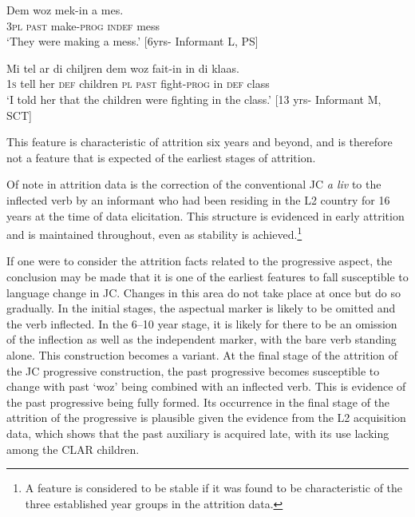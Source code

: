 \documentclass[output=paper,colorlinks,citecolor=brown]{langscibook}
\begin{document}
\ea \label{bkm:messamK:34}
\gll  Dem woz   mek-in       a        mes.\\
3\textsc{pl}    \textsc{past} make-\textsc{prog} \textsc{indef} mess\\
\glt `They were making a mess.’              [6yrs- Informant L, PS]
\z




\ea \label{bkm:messamK:35}
\gll  Mi   tel  ar di    chiljren dem woz  fait-in      in di    klaas.\\
1\textsc{s} tell her  \textsc{def} children \textsc{pl}    \textsc{past} fight-\textsc{prog} in \textsc{def} class\\
\glt `I told her that the children were fighting in the class.’ [13 yrs- Informant M, SCT]
\z




This feature is characteristic of attrition six years and beyond, and is therefore not a feature that is expected of the earliest stages of attrition.

Of note in attrition data is the correction of the conventional JC \textit{a liv} to the inflected verb by an informant who had been residing in the L2 country for 16 years at the time of data elicitation. This structure is evidenced in early attrition and is maintained throughout, even as stability is achieved.\footnote{A feature is considered to be stable if it was found to be characteristic of the three established year groups in the attrition data.}

If one were to consider the attrition facts related to the progressive aspect, the conclusion may be made that it is one of the earliest features to fall susceptible to language change in JC. Changes in this area do not take place at once but do so gradually. In the initial stages, the aspectual marker is likely to be omitted and the verb inflected. In the 6--10 year stage, it is likely for there to be an omission of the inflection as well as the independent marker, with the bare verb standing alone. This construction becomes a variant. At the final stage of the attrition of the JC progressive construction, the past progressive becomes susceptible to change with past ‘woz’ being combined with an inflected verb. This is evidence of the past progressive being fully formed. Its occurrence in the final stage of the attrition of the progressive is plausible given the evidence from the L2 acquisition data, which shows that the past auxiliary is acquired late, with its use lacking among the CLAR children.
\end{document}
